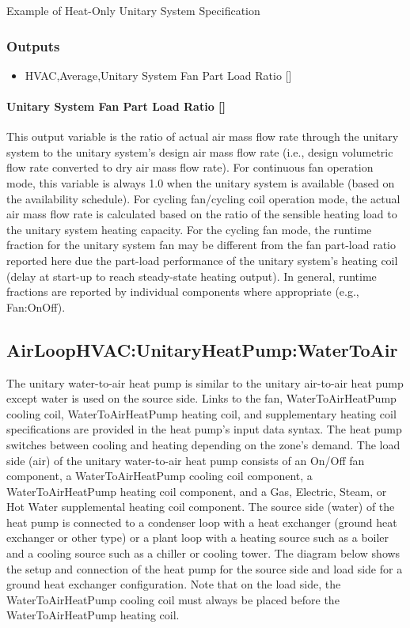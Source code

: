 Example of Heat-Only Unitary System Specification

\subsubsection{Outputs}\label{outputs-5-011}

\begin{itemize}
\tightlist
\item
  HVAC,Average,Unitary System Fan Part Load Ratio {[]}
\end{itemize}

\paragraph{\texorpdfstring{Unitary System Fan Part Load Ratio {[]}}{Unitary System Fan Part Load Ratio }}\label{unitary-system-fan-part-load-ratio-6}

This output variable is the ratio of actual air mass flow rate through the unitary system to the unitary system's design air mass flow rate (i.e., design volumetric flow rate converted to dry air mass flow rate). For continuous fan operation mode, this variable is always 1.0 when the unitary system is available (based on the availability schedule). For cycling fan/cycling coil operation mode, the actual air mass flow rate is calculated based on the ratio of the sensible heating load to the unitary system heating capacity. For the cycling fan mode, the runtime fraction for the unitary system fan may be different from the fan part-load ratio reported here due the part-load performance of the unitary system's heating coil (delay at start-up to reach steady-state heating output). In general, runtime fractions are reported by individual components where appropriate (e.g., Fan:OnOff).

\subsection{AirLoopHVAC:UnitaryHeatPump:WaterToAir}\label{airloophvacunitaryheatpumpwatertoair}

The unitary water-to-air heat pump is similar to the unitary air-to-air heat pump except water is used on the source side. Links to the fan, WaterToAirHeatPump cooling coil, WaterToAirHeatPump heating coil, and supplementary heating coil specifications are provided in the heat pump's input data syntax. The heat pump switches between cooling and heating depending on the zone's demand. The load side (air) of the unitary water-to-air heat pump consists of an On/Off fan component, a WaterToAirHeatPump cooling coil component, a WaterToAirHeatPump heating coil component, and a Gas, Electric, Steam, or Hot Water supplemental heating coil component. The source side (water) of the heat pump is connected to a condenser loop with a heat exchanger (ground heat exchanger or other type) or a plant loop with a heating source such as a boiler and a cooling source such as a chiller or cooling tower. The diagram below shows the setup and connection of the heat pump for the source side and load side for a ground heat exchanger configuration. Note that on the load side, the WaterToAirHeatPump cooling coil must always be placed before the WaterToAirHeatPump heating coil.

